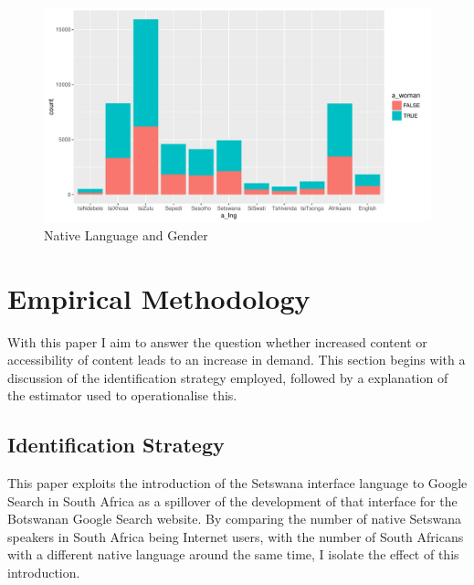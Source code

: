 \documentclass[a4paper,british]{article}\usepackage[]{graphicx}\usepackage[]{color}
\makeatletter
\def\maxwidth{ %
  \ifdim\Gin@nat@width>\linewidth
    \linewidth
  \else
    \Gin@nat@width
  \fi
}
\newenvironment{knitrout}{}{} %
\makeatother
\begin{document}
\begin{figure}[H]
\caption{Native Language and Gender}

\label{fig:langsex}

\begin{knitrout}
\color{fgcolor}
\includegraphics[width=\maxwidth]{../Making-Next-Billion-Demand-Access/misc/latex-lang_woman-1} 

\end{knitrout}
\end{figure}


\section{Empirical Methodology}

\label{sec:methods}With this paper I aim to answer the question whether
increased content or accessibility of content leads to an increase
in demand. This section begins with a discussion of the identification
strategy employed, followed by a explanation of the estimator used
to operationalise this.

\subsection{Identification Strategy}

\label{subsec:identification}This paper exploits the introduction
of the Setswana interface language to Google Search in South Africa
as a spillover of the development of that interface for the Botswanan
Google Search website. By comparing the number of native Setswana
speakers in South Africa being Internet users, with the number of
South Africans with a different native language around the same time,
I isolate the effect of this introduction.
\end{document}
